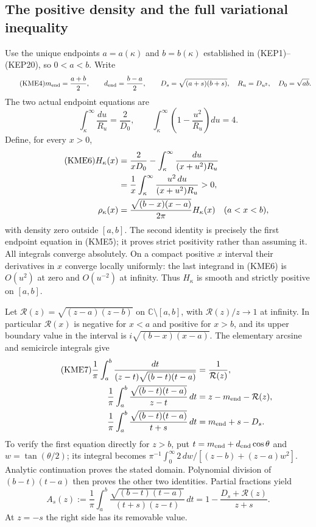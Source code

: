 

\subsection{The positive density and the full variational inequality}
Use the unique endpoints $a=a(\kappa)$ and $b=b(\kappa)$ established in
(KEP1)--(KEP20), so $0<a<b$. Write
\begin{equation}\tag{KME4}
 m_{\rm end}=\frac{a+b}{2},\qquad d_{\rm end}=\frac{b-a}{2},\qquad
 D_s=\sqrt{(a+s)(b+s)},\quad R_u=D_{u^2},\quad D_0=\sqrt{ab}.
\end{equation}
The two actual endpoint equations are
\begin{equation}\tag{KME5}
 \int_\kappa^\infty\frac{du}{R_u}=\frac2{D_0},\qquad
 \int_\kappa^\infty\left(1-\frac{u^2}{R_u}\right)du=4.
\end{equation}
Define, for every $x>0$,
\begin{align}\tag{KME6}
 H_\kappa(x)
 &=\frac2{xD_0}-\int_\kappa^\infty\frac{du}{(x+u^2)R_u}\\
 &=\frac1x\int_\kappa^\infty
                  \frac{u^2\,du}{(x+u^2)R_u}>0,\notag\\
 \rho_\kappa(x)&=\frac{\sqrt{(b-x)(x-a)}}{2\pi}H_\kappa(x)
                  \quad(a<x<b),\notag
\end{align}
with density zero outside $[a,b]$.  The second identity is precisely the
first endpoint equation in (KME5); it proves strict positivity rather
than assuming it. All integrals converge absolutely. On a compact
positive $x$ interval their derivatives in $x$ converge locally uniformly:
the last integrand in (KME6) is $O(u^2)$ at zero and $O(u^{-2})$
at infinity. Thus $H_\kappa$ is smooth and strictly positive on $[a,b]$.

Let $\mathcal R(z)=\sqrt{(z-a)(z-b)}$ on
$\mathbb C\setminus[a,b]$, with $\mathcal R(z)/z\to1$ at infinity.
In particular $\mathcal R(x)$ is negative for $x<a$ and positive for
$x>b$, and its upper boundary value in the interval is
$i\sqrt{(b-x)(x-a)}$.
The elementary arcsine and semicircle integrals give
\begin{align}\tag{KME7}
 \frac1\pi\int_a^b
    \frac{dt}{(z-t)\sqrt{(b-t)(t-a)}}&=\frac1{\mathcal R(z)},\\
 \frac1\pi\int_a^b
    \frac{\sqrt{(b-t)(t-a)}}{z-t}\,dt&=z-m_{\rm end}-\mathcal R(z),\notag\\
 \frac1\pi\int_a^b
    \frac{\sqrt{(b-t)(t-a)}}{t+s}\,dt&=m_{\rm end}+s-D_s.\notag
\end{align}
To verify the first equation directly for $z>b$, put
$t=m_{\rm end}+d_{\rm end}\cos\theta$ and $w=\tan(\theta/2)$; its integral becomes
$\pi^{-1}\int_0^\infty2\,dw/[(z-b)+(z-a)w^2]$.
Analytic continuation proves the stated domain. Polynomial division
of $(b-t)(t-a)$ then proves the other two identities.
Partial fractions yield
\begin{equation}\tag{KME8}
 A_s(z):=\frac1\pi\int_a^b
  \frac{\sqrt{(b-t)(t-a)}}{(t+s)(z-t)}\,dt
   =1-\frac{D_s+\mathcal R(z)}{z+s}.
\end{equation}
At $z=-s$ the right side has its removable value.

